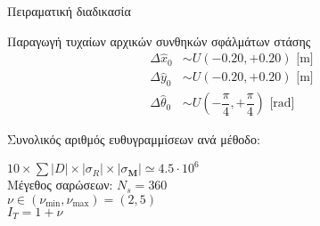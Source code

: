 \begin{frame}{Πειραματική διαδικασία}
{\begin{minipage}{\linewidth}
\begin{minipage}{0.56\linewidth}
\begin{bw_box}
      Παραγωγή τυχαίων αρχικών συνθηκών σφάλμάτων στάσης
      \begin{align}
        \Delta \hat{x}_0     &\sim U(-0.20,+0.20) \text{ [m]} \nonumber \\
        \Delta \hat{y}_0     &\sim U(-0.20,+0.20)  \text{ [m]}\nonumber \\
        \Delta\hat{\theta}_0 &\sim U(-\dfrac{\pi}{4}, +\dfrac{\pi}{4})  \text{ [rad]}\nonumber
      \end{align}

      Συνολικός αριθμός ευθυγραμμίσεων ανά μέθοδο:

      $10 \times \sum |D| \times |\sigma_R| \times |\sigma_{\bm{M}}| \simeq 4.5 \cdot 10^6$\\

      Μέγεθος σαρώσεων: $N_s = 360$\\

      $\nu \in (\nu_{\min}, \nu_{\max}) = (2,5)$ \\

      $I_T = 1+\nu$

      \end{bw_box}

      \vspace{-0.5cm}

      \scriptsize
      \begin{center}

      \end{center}
    \end{minipage}
  \end{minipage}
  }


\end{frame}

